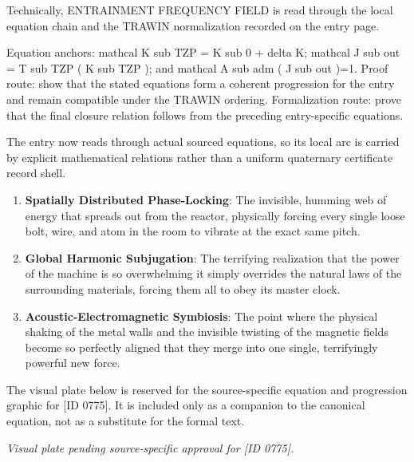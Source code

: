 Technically, ENTRAINMENT FREQUENCY FIELD is read through the local equation chain and the TRAWIN normalization recorded on the entry page.

Equation anchors: mathcal K sub TZP = K sub 0 + delta K; mathcal J sub out = T sub TZP ( K sub TZP ); and mathcal A sub adm ( J sub out )=1. Proof route: show that the stated equations form a coherent progression for the entry and remain compatible under the TRAWIN ordering. Formalization route: prove that the final closure relation follows from the preceding entry-specific equations.

The entry now reads through actual sourced equations, so its local arc is carried by explicit mathematical relations rather than a uniform quaternary certificate record shell.
\endgroup

\begin{enumerate}[leftmargin=1.6em,itemsep=6pt,topsep=4pt]
\item \textbf{Spatially Distributed Phase-Locking}: The invisible, humming web of energy that spreads out from the reactor, physically forcing every single loose bolt, wire, and atom in the room to vibrate at the exact same pitch.
\item \textbf{Global Harmonic Subjugation}: The terrifying realization that the power of the machine is so overwhelming it simply overrides the natural laws of the surrounding materials, forcing them all to obey its master clock.
\item \textbf{Acoustic-Electromagnetic Symbiosis}: The point where the physical shaking of the metal walls and the invisible twisting of the magnetic fields become so perfectly aligned that they merge into one single, terrifyingly powerful new force.
\end{enumerate}

\begingroup\footnotesize\sloppy
The visual plate below is reserved for the source-specific equation and progression graphic for [ID 0775]. It is included only as a companion to the canonical equation, not as a substitute for the formal text.
\par\endgroup
\begingroup\footnotesize\itshape
Visual plate pending source-specific approval for [ID 0775].
\par\endgroup

